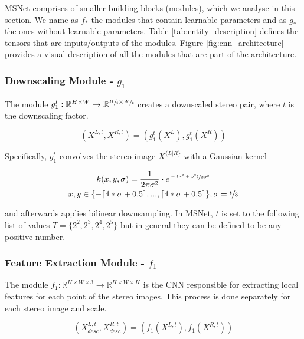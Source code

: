 \documentclass[runningheads]{llncs}
\begin{document}
MSNet comprises of smaller building blocks (modules), which we analyse in this section. We name as $f_*$ the modules that contain learnable parameters and as $g_*$ the ones without learnable parameters. Table \ref{tab:entity_description} defines the tensors that are inputs/outputs of the modules. Figure \ref{fig:cnn_architecture} provides a visual description of all the modules that are part of the architecture.

\subsubsection{Downscaling Module - $g_1$}

The module $g_1^t : \mathbb{R}^{H \times W} \rightarrow \mathbb{R}^{\sfrac{H}{t} \times \sfrac{W}{t}}$ creates a downscaled stereo pair, where $t$ is the downscaling factor. 

\begin{equation} \label{eq:g1}
    (X^{L,t}, X^{R,t}) = (g_1^t(X^L), g_1^t(X^R))
\end{equation}{}

Specifically, $g_1^t$ convolves the stereo image $X^{\{L|R\}}$ with a Gaussian kernel 

\begin{gather} \label{eq:g1_kernel}
    k(x, y, \sigma) = \frac{1}{2\pi\sigma^2} \cdot e^{\sfrac{-(x^2 + y^2)}{2\sigma^2}} \\
    x,y \in \{-\lceil 4*\sigma + 0.5 \rceil, ..., \lceil 4*\sigma + 0.5 \rceil\}, \sigma = \sfrac{t}{3}
\end{gather}

and afterwards applies bilinear downsampling. In MSNet, $t$ is set to the following list of values $ T = \{ 2^2, 2^3, 2^4, 2^5 \}$ but in general they can be defined to be any positive number. 


\subsubsection{Feature Extraction Module - $f_1$}

The module $f_1: \mathbb{R}^{H \times W \times 3} \rightarrow \mathbb{R}^{H \times W \times K}$ is the CNN responsible for extracting local features for each point of the stereo images. This process is done separately for each stereo image and scale.

\begin{equation} \label{eq:f_1}
    (X^{L,t}_{desc}, X^{R,t}_{desc}) = (f_1(X^{L,t}), f_1(X^{R, t}))
\end{equation} 
\end{document}
